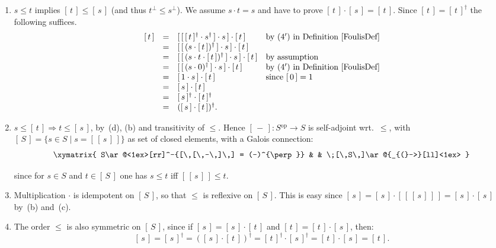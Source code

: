 \documentclass{article}
\newcommand{\op}{\ensuremath{^{\mathrm{op}}}}
\newcommand{\setin}[3]{\{#1\in#2\;|\;#3\}}
\newcommand{\sai}[1]{[\,#1\,]}
\begin{document}
{\begin{enumerate}
\noindent Hence we can apply~(a), so that $\sai{\sai{\sai{s}}} =
\sai{s} \cdot \sai{\sai{\sai{s}}} = \sai{s}$, where the last equation
follows by applying~(b) to $\sai{s}$.

\item $s\leq t$ implies $\sai{t} \leq \sai{s}$ (and thus $t^{\perp} \leq
  s^{\perp}$). We assume $s\cdot t = s$ and have to prove $\sai{t}\cdot
  \sai{s} = \sai{t}$. Since $\sai{t} = \sai{t}^{\dag}$ the following suffices.
$$\begin{array}{rcll}
\sai{t}
& = &
\sai{\sai{\sai{t}^{\dag} \cdot s^{\dag}}\cdot s}\cdot \sai{t}
   & \mbox{by~$(4')$ in Definition~\ref{FoulisDef}} \\
& = &
\sai{\sai{(s\cdot \sai{t})^{\dag}}\cdot s}\cdot \sai{t} \\
& = &
\sai{\sai{(s\cdot t \cdot \sai{t})^{\dag}}\cdot s}\cdot \sai{t} 
   & \mbox{by assumption} \\
& = &
\sai{\sai{(s\cdot 0)^{\dag}}\cdot s}\cdot \sai{t} 
   & \mbox{by~$(4')$ in Definition~\ref{FoulisDef}} \\
& = &
\sai{1\cdot s}\cdot \sai{t} 
   & \mbox{since $\sai{0}=1$} \\
& = &
\sai{s}\cdot \sai{t} \\
& = &
\sai{s}^{\dag}\cdot \sai{t}^{\dag} \\
& = &
(\sai{s}\cdot \sai{t})^{\dag}.
\end{array}$$

\item $s\leq \sai{t} \Rightarrow t\leq \sai{s}$, by~(d), (b) and
  transitivity of $\leq$. Hence $\sai{-}\colon S\op \rightarrow S$ is
  self-adjoint wrt.\ $\leq$, with $\sai{S} =
  \setin{s}{S}{s=\sai{\sai{s}}}$ as set of closed elements, with a
  Galois connection:
\begin{equation}
\label{PsquareGaloisEqn}
\xymatrix{
S\ar@<1ex>[rr]^-{\sai{\sai{-}} = (-)^{\perp}} & & \;\sai{S}\ar@{_{(}->}[ll]<1ex>
}
\end{equation}

\noindent since for $s\in S$ and $t\in \sai{S}$ one has $s\leq t$
iff $\sai{\sai{s}} \leq t$.

\item Multiplication $\cdot$ is idempotent on $\sai{S}$, so that $\leq$
  is reflexive on $\sai{S}$.  This is easy since $\sai{s} = \sai{s}\cdot
  \sai{\sai{\sai{s}}} = \sai{s}\cdot \sai{s}$ by~(b) and~(c).

\item The order $\leq$ is also symmetric on $\sai{S}$, since if $\sai{s} =
  \sai{s}\cdot \sai{t}$ and $\sai{t} = \sai{t}\cdot \sai{s}$, then:
$$\sai{s}
=
\sai{s}^{\dag}
=
(\sai{s}\cdot \sai{t})^{\dag}
=
\sai{t}^{\dag} \cdot \sai{s}^{\dag}
=
\sai{t}\cdot \sai{s}
=
\sai{t}.$$


\end{enumerate}}
\end{document}
